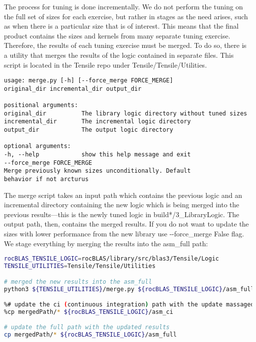 \documentclass[]{article}
\begin{document}
\noindent
The process for tuning is done incrementally. We do not perform the tuning on the full set of sizes for each exercise, but rather in stages as the need arises, such as when there is a particular size that is of interest. This means that the final product contains the sizes and kernels from many separate tuning exercise. Therefore, the results of each tuning exercise must be merged. To do so, there is a utility that merges the results of the logic contained in separate files. This script is located in the Tensile repo under Tensile/Tensile/Utilities.

\begin{lstlisting}
usage: merge.py [-h] [--force_merge FORCE_MERGE]
original_dir incremental_dir output_dir

positional arguments:
original_dir          The library logic directory without tuned sizes
incremental_dir       The incremental logic directory
output_dir            The output logic directory

optional arguments:
-h, --help            show this help message and exit
--force_merge FORCE_MERGE
Merge previously known sizes unconditionally. Default
behavior if not arcturus
\end{lstlisting}

The merge script takes an input path which contains the previous logic and an incremental directory containing the new logic which is being merged into the previous results---this is the newly tuned logic in build*/3\_LibraryLogic. The output path, then, contains the merged results. If you do not want to update the sizes with lower performance from the new library use -{}-force\_merge False flag. We stage everything by merging the results into the asm\_full path:

\begin{lstlisting}[language=bash,breaklines=true,commentstyle=\color{ForestGreen}]
rocBLAS_TENSILE_LOGIC=rocBLAS/library/src/blas3/Tensile/Logic
TENSILE_UTILITIES=Tensile/Tensile/Utilities

# merged the new results into the asm_full
python3 ${TENSILE_UTILITIES}/merge.py ${rocBLAS_TENSILE_LOGIC}/asm_full newLogicPath mergedPath

%# update the ci (continuous integration) path with the update massaged results
%cp mergedPath/* ${rocBLAS_TENSILE_LOGIC}/asm_ci

# update the full path with the updated results
cp mergedPath/* ${rocBLAS_TENSILE_LOGIC}/asm_full
\end{lstlisting}
\end{document}
